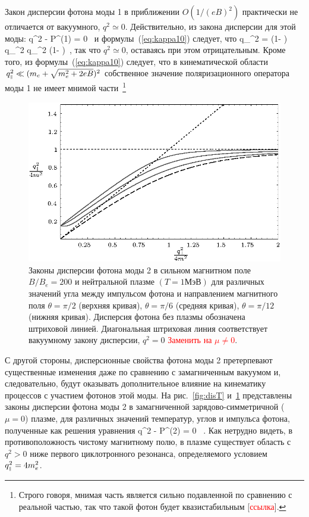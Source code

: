 Закон дисперсии фотона моды 1 в приближении $O(1/(eB)^2)$ практически не отличается от вакуумного, $q^2 \simeq 0$. Действительно, из закона дисперсии для этой моды:
%
\beq
q^2 - {\cal P}^{(1)} = 0 \, 
\label{disper1}
\eeq
\noindent и формулы~(\ref{eq:kappa10}) следует, что
%
\beq
q_{\mprl}^2 = \left (1- \frac{\alpha}{3\pi}  \right) \, q_{\mprp}^2  
\simeq q_{\mprp}^2 \left (1- \frac{\alpha}{3\pi} \right)\, , 
\label{disper12}
\eeq
\noindent так что $q^2 \simeq 0$, оставаясь при этом отрицательным. Кроме того, из формулы~(\ref{eq:kappa10}) следует, что в кинематической области $q^2_{\mbox{\tiny $\|$}} \ll (m_e+\sqrt{m_e^2+2 eB})^2$ собственное значение поляризационного оператора моды 1 не имеет мнимой части~\footnote{Строго говоря, мнимая часть является сильно подавленной по сравнению с реальной частью, так что такой фотон будет квазистабильным [\textcolor{red}{ссылка}].}

\begin{figure}[t]
	\centerline{\includegraphics[width=15cm]{fig2_2.eps}} \vspace*{-2mm}
	\caption{Законы дисперсии фотона моды 2 в сильном магнитном поле  $B/B_e = 200$  
		и нейтральной плазме $(T = 1 \mbox{МэВ})$ для различных значений
		угла  между импульсом фотона  и направлением  магнитного поля
		$\theta = \pi/2$ (верхняя кривая), $\theta = \pi/6$  (средняя кривая), $\theta = \pi/12$
		(нижняя кривая).
		Дисперсия фотона без плазмы обозначена штриховой линией.
		Диагональная штриховая линия соответствует вакуумному закону дисперсии, $q^2 = 0$ \textcolor{red}{Заменить на $\mu \neq 0$}.
	}
	\label{fig:disTheta}
\end{figure}

С другой стороны, дисперсионные свойства фотона моды 2  претерпевают существенные изменения даже по сравнению с замагниченным вакуумом и, следовательно, будут оказывать дополнительное влияние на кинематику процессов с участием фотонов этой моды. На рис.~\ref{fig:disT} и~\ref{fig:disTheta} представлены законы дисперсии фотона моды 2 в замагниченной зарядово-симметричной ($\mu=0$) плазме, для различных значений температур, углов и импульса фотона, полученные как решения уравнения
%
\beq
q^2 - {\cal P}^{(2)} = 0 \, .
\label{disper}
\eeq
\noindent Как нетрудно видеть, в противоположность чистому 
магнитному полю, в плазме существует область с  $q^2 > 0$ ниже  первого  
циклотронного резонанса, определяемого условием $q^2_{\mbox{\tiny $\|$}} = 4 m_e^2$. 


